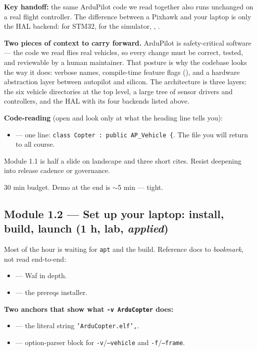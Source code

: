 \documentclass[a4paper,11pt,twoside]{article}
\renewcommand{\instnote}[1]{\ifinstructor\begin{tcolorbox}[colback=blue!4!white,colframe=blue!40!black,title=Instructor note,breakable]#1\end{tcolorbox}\fi}
\renewcommand{\insttiming}[1]{\ifinstructor\begin{tcolorbox}[colback=orange!5!white,colframe=orange!50!black,title=Pacing,breakable]#1\end{tcolorbox}\fi}
\begin{document}
\textbf{Key handoff:} the same ArduPilot code we read together also runs unchanged on a real flight controller. The difference between a Pixhawk and your laptop is only the HAL backend:  for STM32,  for the simulator, , .

\textbf{Two pieces of context to carry forward.} ArduPilot is safety-critical software --- the code we read flies real vehicles, so every change must be correct, tested, and reviewable by a human maintainer. That posture is why the codebase looks the way it does: verbose names, compile-time feature flags (), and a hardware abstraction layer between autopilot and silicon. The architecture is three layers: the six vehicle directories at the top level, a large  tree of sensor drivers and controllers, and the HAL with its four backends listed above.

\textbf{Code-reading} (open and look only at what the heading line tells you):
\begin{itemize}
  \item {} --- one line: \texttt{class Copter : public AP\_Vehicle \{}. The file you will return to all course.
\end{itemize}

\instnote{Module 1.1 is half a slide on landscape and three short cites. Resist deepening into release cadence or governance.}
\insttiming{30 min budget. Demo at the end is $\sim$5 min --- tight.}

\subsection{Module 1.2 --- Set up your laptop: install, build, launch (1 h, lab, \emph{applied})}

Most of the hour is waiting for \texttt{apt} and the build. Reference docs to \emph{bookmark}, not read end-to-end:
\begin{itemize}
  \item {} --- Waf in depth.
  \item {} --- the prereqs installer.
\end{itemize}

\textbf{Two anchors that show what \texttt{-v ArduCopter} does:}
\begin{itemize}
  \item {} --- the literal string \texttt{'ArduCopter.elf',}.
  \item {} --- option-parser block for \texttt{-v}/\texttt{--vehicle} and \texttt{-f}/\texttt{--frame}.
\end{itemize}
\end{document}
